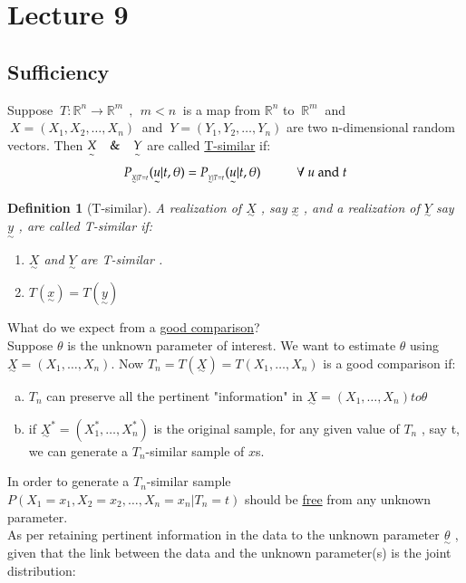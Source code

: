 \documentclass[14pt,twoside,a4paper,fleqn]{article}
\theoremstyle{plain}
\newtheorem{definition}{Definition}[section]
\begin{document}
\newpage
\section{Lecture 9}
\subsection{Sufficiency}
Suppose $\ T:\mathbb{R}^n\to\mathbb{R}^m\ \ ,\ \ m<n\ $ is a map from $\mathbb{R}^n$ to $\ \mathbb{R}^m\ $ and $\ X=(X_1,X_2,\ldots,X_n)\ $ and $\ Y=(Y_1,Y_2,\ldots,Y_n)$ are two n-dimensional random vectors. Then \mbox{$\underset{\sim}{X}\ \ \And\ \ \underset{\sim}{Y}$} are called \underline{T-similar} if:
$$
	P_{_{\underset{\sim}{X}\vert{T=t}}}(\underset{\sim}{u}\vert t,\theta) = P_{_{\underset{\sim}{Y}\vert{T=t}}}(\underset{\sim}{u}\vert t,\theta) \hspace*{1cm} \forall\ u\ \text{and\ }t
$$
\begin{definition}[T-similar]A realization of $\underset{\sim}{X}$ , say $\underset{\sim}{x}$ , and a realization of $\underset{\sim}{Y}$ say $\underset{\sim}{y}$ , are called T-similar if:
\begin{enumerate}
\item $\underset{\sim}{X}$ and $\underset{\sim}{Y}$ are T-similar .
\item $T(\underset{\sim}{x}) = T(\underset{\sim}{y})$
\end{enumerate}
\end{definition}
What do we expect from a \underline{good comparison}?\\
Suppose $\theta$ is the unknown parameter of interest. We want to estimate $\theta$ using \mbox{$\underset{\sim}{X} = (X_1,\ldots,X_n)$}. Now \mbox{$T_n = T(\underset{\sim}{X}) = T(X_1,\ldots,X_n)$} is a good comparison if:
\begin{enumerate}[a)]
\item	$T_n$ can preserve all the pertinent "information" in \mbox{$\underset{\sim}{X} = (X_1,\ldots,X_n) to \theta$}
\item if $\underset{\sim}{X}^{*} = (X_1^{*},\ldots,X_n^{*})$ is the original sample, for any given value of $T_n$ , say t, we can generate a $T_n$-similar sample of $x$s.
\end{enumerate}
In order to generate a $T_n$-similar sample \mbox{$P(X_1=x_1,X_2=x_2,\ldots,X_n=x_n \vert T_n=t)$} should be \underline{free} from any unknown parameter.\\
As per retaining pertinent information in the data to the unknown parameter $\underset{\sim}{\theta}$ , given that the link between the data and the unknown parameter(s) is the joint distribution:
\end{document}
